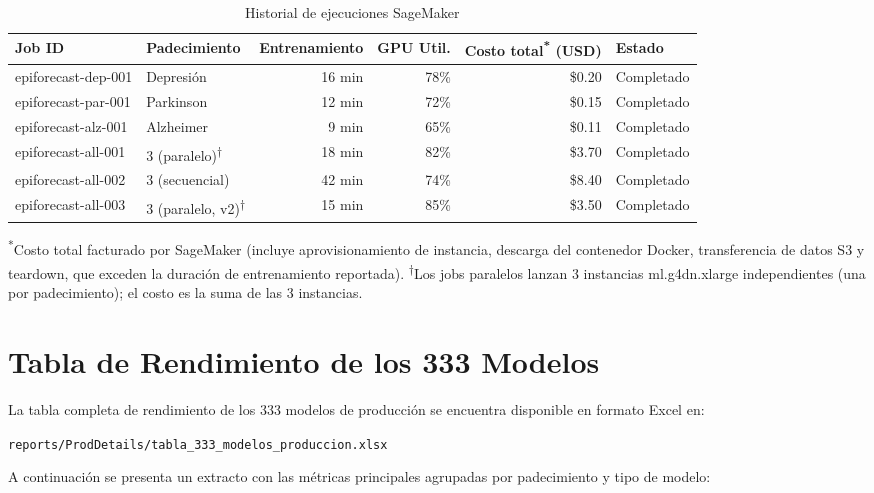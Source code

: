 \documentclass[12pt, letterpaper]{article}
\begin{document}
\begin{table}[H]
\centering
\caption{Historial de ejecuciones SageMaker}
\label{tab:logs_sagemaker}
\scriptsize
\setlength{\tabcolsep}{3pt}
\begin{tabularx}{\textwidth}{l X r r r l}
\toprule
\textbf{Job ID} & \textbf{Padecimiento} & \textbf{Entrenamiento} & \textbf{GPU Util.} & \textbf{Costo total\textsuperscript{*} (USD)} & \textbf{Estado} \\
\midrule
epiforecast-dep-001 & Depresión & 16 min & 78\% & \$0.20 & Completado \\
epiforecast-par-001 & Parkinson & 12 min & 72\% & \$0.15 & Completado \\
epiforecast-alz-001 & Alzheimer & 9 min & 65\% & \$0.11 & Completado \\
epiforecast-all-001 & 3 (paralelo)\textsuperscript{$\dagger$} & 18 min & 82\% & \$3.70 & Completado \\
epiforecast-all-002 & 3 (secuencial) & 42 min & 74\% & \$8.40 & Completado \\
epiforecast-all-003 & 3 (paralelo, v2)\textsuperscript{$\dagger$} & 15 min & 85\% & \$3.50 & Completado \\
\bottomrule
\end{tabularx}
\vspace{0.3em}
{\scriptsize \textsuperscript{*}Costo total facturado por SageMaker (incluye aprovisionamiento de instancia, descarga del contenedor Docker, transferencia de datos S3 y teardown, que exceden la duración de entrenamiento reportada). \textsuperscript{$\dagger$}Los jobs paralelos lanzan 3 instancias ml.g4dn.xlarge independientes (una por padecimiento); el costo es la suma de las 3 instancias.}
\end{table}

\section{Tabla de Rendimiento de los 333 Modelos}\label{sec:tabla_333}

La tabla completa de rendimiento de los 333 modelos de producción se encuentra disponible en formato Excel en:

\begin{center}
\texttt{reports/ProdDetails/tabla\_333\_modelos\_produccion.xlsx}
\end{center}

A continuación se presenta un extracto con las métricas principales agrupadas por padecimiento y tipo de modelo:
\end{document}
